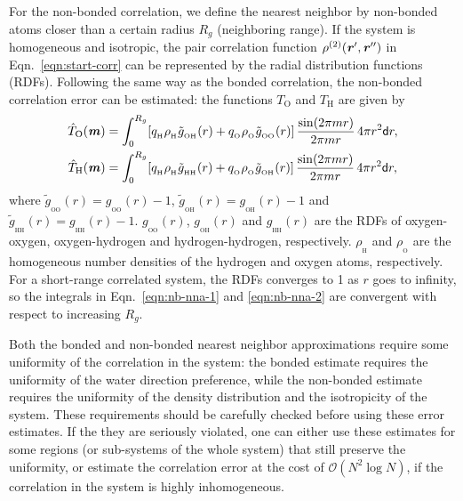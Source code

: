 \documentclass[aps,pre,preprint,unsortedaddress]{revtex4}
\newcommand{\recheck}[1]{{\color{red} #1}}
\renewcommand{\v}[1]{\textbf{\textit{#1}}}
\renewcommand{\d}[1]{\textsf{#1}}
\begin{document}
\recheck{
  For the non-bonded correlation,
  we define the nearest neighbor
  by non-bonded atoms closer than a certain radius $R_g$ (neighboring range).
  If the system is homogeneous and isotropic, the pair
  correlation function $\rho^{(2)}(\v r', \v r'')$ in
  Eqn.~\eqref{eqn:start-corr} can be represented by the radial
  distribution functions (RDFs).
  Following the same way as the bonded correlation,
  the non-bonded correlation error can be estimated:
  the functions $T_{\textrm{O}}$ and $T_{\textrm{H}}$
  are given by
  \begin{align}\label{eqn:nb-nna-1}
    \hat T_{\textrm{O}} (\v m)
    &= \int_0^{R_g}
    [q_{_{\textrm{H}}} \rho_{_{\textrm{H}}} \tilde g_{_{\textrm{OH}}}(r)
    +q_{_{\textrm{O}}} \rho_{_{\textrm{O}}} \tilde g_{_{\textrm{OO}}}(r)]
    \,\frac{\sin(2\pi m r)}{2\pi mr}\,4\pi r^2 \d dr,\\\label{eqn:nb-nna-2}
    \hat T_{\textrm{H}} (\v m)
    &= \int_0^{R_g}
    [q_{_{\textrm{H}}} \rho_{_{\textrm{H}}} \tilde g_{_{\textrm{HH}}}(r)
    +q_{_{\textrm{O}}} \rho_{_{\textrm{O}}} \tilde g_{_{\textrm{OH}}}(r)]
    \,\frac{\sin(2\pi m r)}{2\pi mr}\,4\pi r^2 \d dr,
  \end{align}
  where
  $\tilde g_{_{\textrm{OO}}}(r) = g_{_{\textrm{OO}}}(r) - 1$,
  $\tilde g_{_{\textrm{OH}}}(r) = g_{_{\textrm{OH}}}(r) - 1$ and
  $\tilde g_{_{\textrm{HH}}}(r) = g_{_{\textrm{HH}}}(r) - 1$.
  $g_{_{\textrm{OO}}}(r)$, $g_{_{\textrm{OH}}}(r)$ and $g_{_{\textrm{HH}}}(r)$
  are the RDFs of oxygen-oxygen, oxygen-hydrogen and hydrogen-hydrogen,
  respectively. $\rho_{_{\textrm{H}}}$ and $\rho_{_{\textrm{O}}}$ are
  the homogeneous number densities
  of the hydrogen and oxygen atoms, respectively.
  For a short-range correlated system, the RDFs converges to 1
  as $r$ goes to infinity, so the integrals in Eqn.~\eqref{eqn:nb-nna-1}
  and \eqref{eqn:nb-nna-2} are convergent with respect to
  increasing $R_g$. 

  Both the bonded and non-bonded nearest neighbor approximations
  require some uniformity of the correlation in the system:
  the bonded estimate requires the uniformity of the water
  direction preference, while the non-bonded estimate requires the uniformity
  of the density distribution and the isotropicity of the system.
  These requirements should be carefully checked before using
  these error estimates.
  If the they are seriously violated,
  one can either use these estimates for 
  some regions (or sub-systems of the whole system) that
  still preserve the uniformity,
  or estimate the correlation error at the cost of
  $\mathcal O(N^2\log N)$, if the correlation in the system is highly
  inhomogeneous.  
  
}
\end{document}
